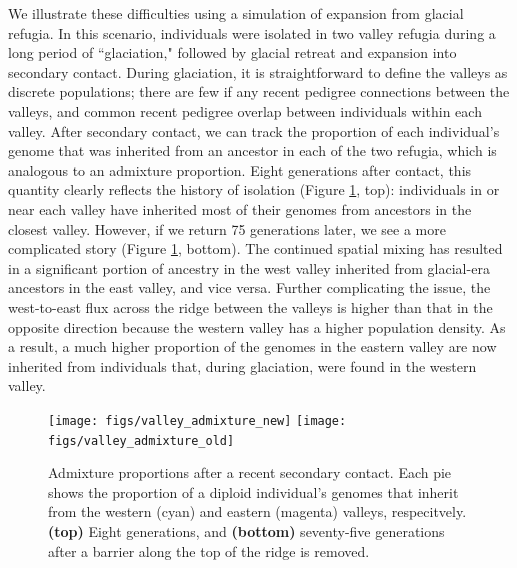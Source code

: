 \documentclass{ar-1col}
\begin{document}
We illustrate these difficulties
using a simulation of expansion from glacial refugia.
In this scenario, 
individuals were isolated in two valley refugia during a long period of ``glaciation,"
followed by glacial retreat and expansion into secondary contact.
During glaciation, 
it is straightforward to define the valleys as discrete populations;
there are few if any recent pedigree connections between the valleys, 
and common recent pedigree overlap between individuals within each valley.
After secondary contact, 
we can track the proportion of each individual's genome that 
was inherited from an ancestor in each of the two refugia, 
which is analogous to an admixture proportion.
Eight generations after contact, 
this quantity clearly reflects the history of isolation 
(Figure \ref{postglacial_expansion}, top): 
individuals in or near each valley have inherited most of their genomes 
from ancestors in the closest valley.
However, if we return 75 generations later, 
we see a more complicated story (Figure \ref{postglacial_expansion}, bottom). 
The continued spatial mixing has resulted in a significant 
portion of ancestry in the west valley inherited from 
glacial-era ancestors in the east valley, 
and vice versa.
Further complicating the issue, 
the west-to-east flux across the ridge between the valleys 
is higher than that in the opposite direction 
because the western valley has a higher population density. 
As a result, a much higher proportion of the genomes
in the eastern valley are now inherited 
from individuals that, 
during glaciation, were found in the western valley.

\begin{figure}[H]
    \centering
        \texttt{[image: figs/valley\_admixture\_new]}
        \texttt{[image: figs/valley\_admixture\_old]}
        \caption{
            Admixture proportions after a recent secondary contact.
            Each pie shows the proportion of a diploid individual's genomes
            that inherit from the western (cyan) and eastern (magenta) valleys, respecitvely.
            \textbf{(top)} Eight generations, and
            \textbf{(bottom)} seventy-five generations 
            after a barrier along the top of the ridge is removed.
        }
        \label{postglacial_expansion}
\end{figure}
\end{document}
